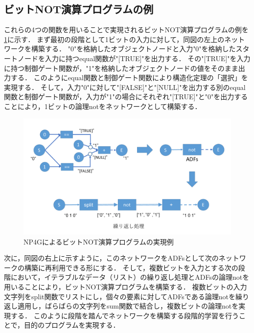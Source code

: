 \documentclass[exploratorypaper]{jsaiart} %
\begin{document}
\subsection{ビットNOT演算プログラムの例}
これらの4つの関数を用いることで実現されるビットNOT演算プログラムの例を\ref{fig:bitwise_not}に示す．
まず最初の段階として1ビットの入力に対して，同図の左上のネットワークを構築する．
"0"を格納したオブジェクトノードと入力"0"を格納したスタートノードを入力に持つequal関数が"[TRUE]"を出力する．
その"[TRUE]"を入力に持つ制御ゲート関数が，"1"を格納したオブジェクトノードの値をそのまま出力する．
このようにequal関数と制御ゲート関数により構造化定理の「選択」を実現する．
そして，入力"0"に対して"[FALSE]"と"[NULL]"を出力する別のequal関数と制御ゲート関数が，入力が"1"の場合にそれぞれ"[TRUE]"と"0"を出力することにより，1ビットの論理notをネットワークとして構築する．

\begin{figure}[t]
    \begin{center}
        \includegraphics[width=150mm]{bitwise_not.png}
    \end{center}
    \capwidth=130mm %
    \caption{NP4GによるビットNOT演算プログラムの実現例}
    \label{fig:bitwise_not}
\end{figure}

次に，同図の右上に示すように，このネットワークをADFsとして次のネットワークの構築に再利用できる形にする．
そして，複数ビットを入力とする次の段階において，イテラブルなデータ（リスト）の繰り返し処理とADFsの論理notを用いることにより，ビットNOT演算プログラムを構築する．
複数ビットの入力文字列をsplit関数でリストにし，個々の要素に対してADFsである論理notを繰り返し適用し，ばらばらの文字列をsum関数で結合し，複数ビットの論理notを実現する．
このように段階を踏んでネットワークを構築する段階的学習を行うことで，目的のプログラムを実現する．
\end{document}

